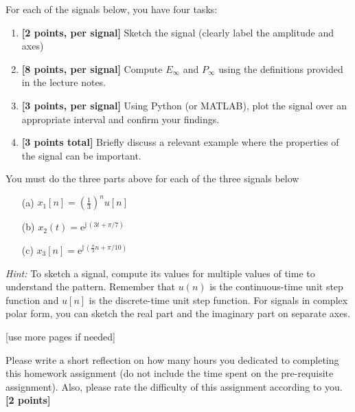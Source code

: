 \documentclass{ee102_pset}
\begin{document}
For each of the signals below, you have four tasks:
\begin{enumerate}
  \item \textbf{[2 points, per signal]} Sketch the signal (clearly label the amplitude and axes)
  \item \textbf{[8 points, per signal]} Compute \(E_{\infty}\) and \(P_{\infty}\) using the definitions provided in the lecture notes.
  \item \textbf{[3 points, per signal]} Using Python (or MATLAB), plot the signal over an appropriate interval and confirm your findings.
  \item \textbf{[3 points total]} Briefly discuss a relevant example where the properties of the signal can be important.
\end{enumerate}
You must do the three parts above for each of the three signals below
\begin{enumerate}
\item[(a)] $x_1[n] = \left(\tfrac{1}{3}\right)^{n} u[n]$

\item[(b)] $x_2(t) = \mathrm{e}^{\mathrm{j}\,(3t+\pi/7)}$

\item[(c)] $x_3[n] = \mathrm{e}^{\mathrm{j}\,(\tfrac{\pi}{3}n+\pi/10)}$
\end{enumerate}
\textit{Hint:} To sketch a signal, compute its values for multiple values of time to understand the pattern. Remember that $u(n)$ is the continuous-time unit step function and $u[n]$ is the discrete-time unit step function. For signals in complex polar form, you can sketch the real part and the imaginary part on separate axes.  
\vspace*{\fill}
\begin{center}
[use more pages if needed]
\end{center}

 Please write a short reflection on how many hours you dedicated to completing this homework assignment (do not include the time spent on the pre-requisite assignment). Also, please rate the difficulty of this assignment according to you. \textbf{[2 points]}
\end{document}
